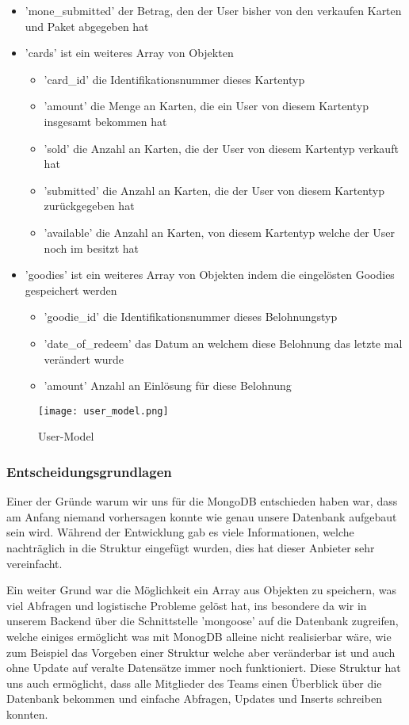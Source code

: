 \begin{itemize}
\begin{itemize}
		\item 'mone\_submitted' der Betrag, den der User bisher von den verkaufen Karten und Paket abgegeben hat
		\item 'cards' ist ein weiteres Array von Objekten
		\begin{itemize}
			\item 'card\_id' die Identifikationsnummer dieses Kartentyp
			\item 'amount' die Menge an Karten, die ein User von diesem Kartentyp insgesamt bekommen hat
			\item 'sold' die Anzahl an Karten, die der User von diesem Kartentyp verkauft hat
			\item 'submitted' die Anzahl an Karten, die der User von diesem Kartentyp zurückgegeben hat
			\item 'available' die Anzahl an Karten, von diesem Kartentyp welche der User noch im besitzt hat
		\end{itemize}
		\item 'goodies' ist ein weiteres Array von Objekten indem die eingelösten Goodies gespeichert werden
		\begin{itemize}
			\item 'goodie\_id' die Identifikationsnummer dieses Belohnungstyp
			\item 'date\_of\_redeem' das Datum an welchem diese Belohnung das letzte mal verändert wurde
			\item 'amount' Anzahl an Einlösung für diese Belohnung
		\end{itemize}
	\end{itemize}
\end{itemize}
\begin{figure}[H]
	\centering
	\texttt{[image: user\_model.png]}
	\caption{User-Model}
\end{figure}	
\newpage	
\subsubsection{Entscheidungsgrundlagen}
Einer der Gründe warum wir uns für die MongoDB entschieden haben war, dass am Anfang niemand vorhersagen konnte wie genau unsere Datenbank aufgebaut sein wird. 
Während der Entwicklung gab es viele Informationen, welche nachträglich in die Struktur eingefügt wurden, dies hat dieser Anbieter sehr vereinfacht. 

Ein weiter Grund war die Möglichkeit ein Array aus Objekten zu speichern, was viel Abfragen und logistische Probleme gelöst hat, ins besondere da wir in unserem Backend über die Schnittstelle 'mongoose' auf 
die Datenbank zugreifen, welche einiges ermöglicht was mit MonogDB alleine nicht realisierbar wäre, wie zum Beispiel das Vorgeben einer Struktur welche aber veränderbar ist und auch ohne Update auf veralte Datensätze immer noch funktioniert. 
Diese Struktur hat uns auch ermöglicht, dass alle Mitglieder des Teams einen Überblick über die Datenbank bekommen und einfache Abfragen, Updates und Inserts schreiben konnten. 


